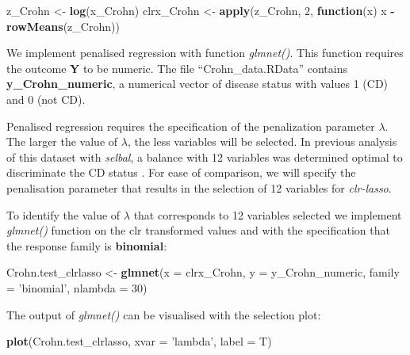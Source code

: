 \documentclass[openany]{book}
\newenvironment{Shaded}{\begin{snugshade}}{\end{snugshade}}
\newcommand{\KeywordTok}[1]{\textcolor[rgb]{0.13,0.29,0.53}{\textbf{#1}}}
\newcommand{\DataTypeTok}[1]{\textcolor[rgb]{0.13,0.29,0.53}{#1}}
\newcommand{\DecValTok}[1]{\textcolor[rgb]{0.00,0.00,0.81}{#1}}
\newcommand{\StringTok}[1]{\textcolor[rgb]{0.31,0.60,0.02}{#1}}
\newcommand{\ControlFlowTok}[1]{\textcolor[rgb]{0.13,0.29,0.53}{\textbf{#1}}}
\newcommand{\OperatorTok}[1]{\textcolor[rgb]{0.81,0.36,0.00}{\textbf{#1}}}
\newcommand{\NormalTok}[1]{#1}
\begin{document}
\begin{Shaded}
\begin{Highlighting}[]
\NormalTok{z_Crohn <-}\StringTok{ }\KeywordTok{log}\NormalTok{(x_Crohn)}
\NormalTok{clrx_Crohn <-}\StringTok{ }\KeywordTok{apply}\NormalTok{(z_Crohn, }\DecValTok{2}\NormalTok{, }\ControlFlowTok{function}\NormalTok{(x) x }\OperatorTok{-}\StringTok{ }\KeywordTok{rowMeans}\NormalTok{(z_Crohn))}
\end{Highlighting}
\end{Shaded}

We implement penalised regression with function \emph{glmnet()}. This
function requires the outcome \textbf{Y} to be numeric. The file
``Crohn\_data.RData'' contains \textbf{y\_Crohn\_numeric}, a numerical
vector of disease status with values 1 (CD) and 0 (not CD).

Penalised regression requires the specification of the penalization
parameter \(\lambda\). The larger the value of \(\lambda\), the less
variables will be selected. In previous analysis of this dataset with
\emph{selbal}, a balance with 12 variables was determined optimal to
discriminate the CD status \citep{rivera2018balances}. For ease of
comparison, we will specify the penalisation parameter that results in
the selection of 12 variables for \emph{clr-lasso}.

To identify the value of \(\lambda\) that corresponds to 12 variables
selected we implement \emph{glmnet()} function on the clr transformed
values and with the specification that the response family is
\textbf{binomial}:

\begin{Shaded}
\begin{Highlighting}[]
\NormalTok{Crohn.test_clrlasso <-}\StringTok{ }\KeywordTok{glmnet}\NormalTok{(}\DataTypeTok{x =}\NormalTok{ clrx_Crohn, }\DataTypeTok{y =}\NormalTok{ y_Crohn_numeric, }
                              \DataTypeTok{family =} \StringTok{'binomial'}\NormalTok{, }\DataTypeTok{nlambda =} \DecValTok{30}\NormalTok{)}
\end{Highlighting}
\end{Shaded}

The output of \emph{glmnet()} can be visualised with the selection plot:

\begin{Shaded}
\begin{Highlighting}[]
\KeywordTok{plot}\NormalTok{(Crohn.test_clrlasso, }\DataTypeTok{xvar =} \StringTok{'lambda'}\NormalTok{, }\DataTypeTok{label =}\NormalTok{ T)}
\end{Highlighting}
\end{Shaded}
\end{document}
